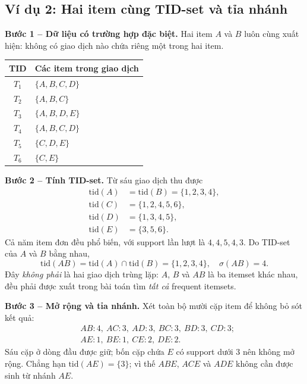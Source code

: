 \subsection{Ví dụ 2: Hai item cùng TID-set và tỉa nhánh}
\noindent\textbf{Bước 1 -- Dữ liệu có trường hợp đặc biệt.} Hai item $A$ và $B$ luôn cùng xuất hiện: không có giao dịch nào chứa riêng một trong hai item.
\begin{center}
\small
\begin{tabular}{@{}cl@{}}\toprule
TID & Các item trong giao dịch\\\midrule
$T_1$ & $\{A,B,C,D\}$\\
$T_2$ & $\{A,B,C\}$\\
$T_3$ & $\{A,B,D,E\}$\\
$T_4$ & $\{A,B,C,D\}$\\
$T_5$ & $\{C,D,E\}$\\
$T_6$ & $\{C,E\}$\\\bottomrule
\end{tabular}
\end{center}
\noindent\textbf{Bước 2 -- Tính TID-set.} Từ sáu giao dịch thu được
\begin{equation*}
\begin{aligned}
\mathrm{tid}(A)&=\mathrm{tid}(B)=\{1,2,3,4\},\\
\mathrm{tid}(C)&=\{1,2,4,5,6\},\\
\mathrm{tid}(D)&=\{1,3,4,5\},\\
\mathrm{tid}(E)&=\{3,5,6\}.
\end{aligned}
\end{equation*}
Cả năm item đơn đều phổ biến, với support lần lượt là $4,4,5,4,3$. Do TID-set của $A$ và $B$ bằng nhau,
\begin{equation*}
\mathrm{tid}(AB)=\mathrm{tid}(A)\cap\mathrm{tid}(B)
=\{1,2,3,4\},\quad\sigma(AB)=4.
\end{equation*}
Đây \emph{không phải} là hai giao dịch trùng lặp: $A$, $B$ và $AB$ là ba itemset khác nhau, đều phải được xuất trong bài toán tìm \emph{tất cả} frequent itemsets.

\noindent\textbf{Bước 3 -- Mở rộng và tỉa nhánh.} Xét toàn bộ mười cặp item để không bỏ sót kết quả:
\begin{equation*}
\begin{aligned}
&AB:4,\ AC:3,\ AD:3,\ BC:3,\ BD:3,\ CD:3;\\
&AE:1,\ BE:1,\ CE:2,\ DE:2.
\end{aligned}
\end{equation*}
Sáu cặp ở dòng đầu được giữ; bốn cặp chứa $E$ có support dưới $3$ nên không mở rộng. Chẳng hạn $\mathrm{tid}(AE)=\{3\}$; vì thế $ABE$, $ACE$ và $ADE$ không cần được sinh từ nhánh $AE$.

